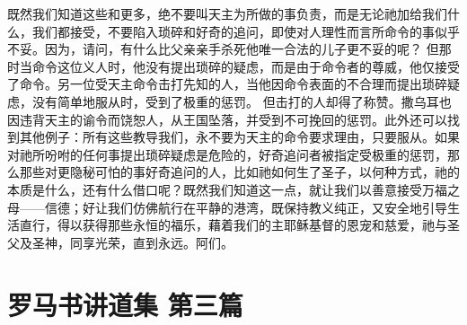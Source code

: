 既然我们知道这些和更多，绝不要叫天主为所做的事负责，而是无论祂加给我们什么，我们都接受，不要陷入琐碎和好奇的追问，即使对人理性而言所命令的事似乎不妥。因为，请问，有什么比父亲亲手杀死他唯一合法的儿子更不妥的呢？ 但那时当命令这位义人时，他没有提出琐碎的疑虑，而是由于命令者的尊威，他仅接受了命令。另一位受天主命令击打先知的人，当他因命令表面的不合理而提出琐碎疑虑，没有简单地服从时，受到了极重的惩罚。 但击打的人却得了称赞。撒乌耳也因违背天主的谕令而饶恕人，从王国坠落，并受到不可挽回的惩罚。此外还可以找到其他例子：所有这些教导我们，永不要为天主的命令要求理由，只要服从。如果对祂所吩咐的任何事提出琐碎疑虑是危险的，好奇追问者被指定受极重的惩罚，那么那些对更隐秘可怕的事好奇追问的人，比如祂如何生了圣子，以何种方式，祂的本质是什么，还有什么借口呢？既然我们知道这一点，就让我们以善意接受万福之母——信德；好让我们仿佛航行在平静的港湾，既保持教义纯正，又安全地引导生活直行，得以获得那些永恒的福乐，藉着我们的主耶稣基督的恩宠和慈爱，祂与圣父及圣神，同享光荣，直到永远。阿们。\par



\section{罗马书讲道集 第三篇}

\par

\par

